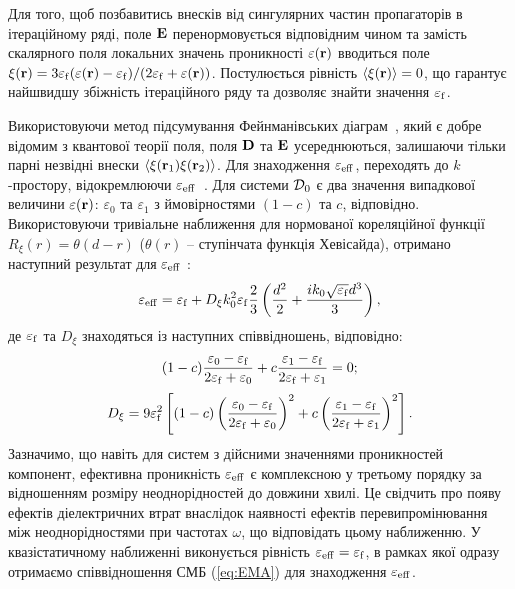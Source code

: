 \documentclass[14pt,twoside]{vakthesis}
\begin{document}
Для того, щоб позбавитись внесків від сингулярних частин пропагаторів в ітераційному ряді, поле $\bf E$ перенормовується відповідним чином та замість скалярного поля локальних значень проникності $\varepsilon({\bf r})$ вводиться поле $\xi({\bf r}) = 3\varepsilon_{\rm f} (\varepsilon({\bf r}) - \varepsilon_{\rm f})/(2\varepsilon_{\rm f} + \varepsilon({\bf r}))$. Постулюється рівність $\langle \xi({\bf r}) \rangle = 0$, що гарантує найшвидшу збіжність ітераційного ряду та дозволяє знайти значення $\varepsilon_{\rm f}$.

Використовуючи метод підсумування Фейнманівських діаграм~\cite{Dence1973}, який є добре відомим з квантової теорії поля, поля $\bf D$ та $\bf E$ усереднюються, залишаючи тільки парні незвідні внески $\langle \xi({\bf r}_1) \xi({\bf r}_2) \rangle$. 
Для знаходження ${\varepsilon}_{\rm eff}$, переходять до $k$-простору, відокремлюючи ${\varepsilon}_{\rm eff}$~\cite{Tsang1981}. Для системи ${\cal D}_0$ є два значення випадкової величини ${\varepsilon}({\bf r})$: ${\varepsilon}_0$ та ${\varepsilon}_1$ з ймовірностями  $(1-c)$ та $c$, відповідно. Використовуючи тривіальне наближення для нормованої кореляційної функції $R_\xi (r) = \theta (d - r)$ ($\theta(r)$ -- ступінчата функція Хевісайда), отримано наступний результат для $\varepsilon_{\rm eff}$ \cite{Tsang1981}:
\begin{equation}\label{eq:eps_eff-SPFT}
{\varepsilon}_{\rm eff} = {\varepsilon}_{\rm f} + D_{\xi} k_0^2 {\varepsilon}_{\rm f} \frac{2}{3} \left( \frac{d^2}{2} + \frac{ik_0 \sqrt{{\varepsilon}_{\rm f}} d^3}{3} \right),
\end{equation}
де $\varepsilon_{\rm f}$ та $D_\xi$ знаходяться із наступних співвідношень, відповідно:
\begin{eqnarray}\label{eq:Brug-SPFT}
(1-c)\frac{{\varepsilon}_0 - {\varepsilon}_{\rm f}}{2{\varepsilon}_{\rm f} + {\varepsilon}_0}
+c\frac{{\varepsilon}_1 - {\varepsilon}_{\rm f}}{2{\varepsilon}_{\rm f} + {\varepsilon}_1} = 0;
\end{eqnarray}
\begin{eqnarray}\label{eq:Dxi-SPFT}
D_{\xi} = 9 {\varepsilon}_{\rm f}^2 \left[ (1-c) \left(\frac{{\varepsilon}_0 - {\varepsilon}_{\rm f}}{2{\varepsilon}_{\rm f} + {\varepsilon}_0} \right)^2
+c \left(\frac{{\varepsilon}_1 - {\varepsilon}_{\rm f}}{2{\varepsilon}_{\rm f} + {\varepsilon}_1}\right)^2 \right].
\end{eqnarray}
Зазначимо, що навіть для систем з дійсними значеннями проникностей компонент, ефективна проникність $\varepsilon_{\rm eff}$ є комплексною у третьому порядку за відношенням розміру неоднорідностей до довжини хвилі. Це свідчить про появу ефектів діелектричних втрат внаслідок наявності ефектів перевипромінювання між неоднорідностями при частотах $\omega$, що відповідать цьому наближенню.
У квазістатичному наближенні виконується рівність ${\varepsilon}_{\rm eff} = {\varepsilon}_{\rm f}$, в рамках якої одразу отримаємо співвідношення СМБ (\ref{eq:EMA}) для знаходження ${\varepsilon}_{\rm eff}$.
\end{document}

